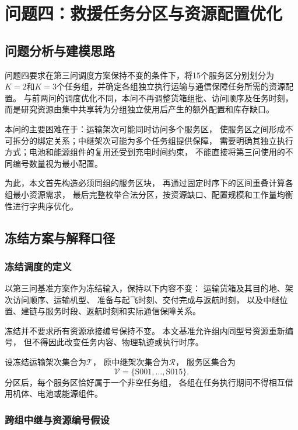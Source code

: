 \documentclass[bwprint]{gmcmthesis}
\begin{document}
\section{问题四：救援任务分区与资源配置优化}

\subsection{问题分析与建模思路}

问题四要求在第三问调度方案保持不变的条件下，将15个服务区分别划分为
$K=2$和$K=3$个任务组，并确定各组独立执行运输与通信保障任务所需的资源配置。
与前两问的调度优化不同，本问不再调整货箱组批、访问顺序及任务时刻，
而是研究资源由集中共享转为分组独立使用后产生的额外配置和库存缺口。

本问的主要困难在于：运输架次可能同时访问多个服务区，
使服务区之间形成不可拆分的绑定关系；中继架次可能为多个任务组提供保障，
需要明确其独立执行方式；电池和能源组件的复用还受到充电时间约束，
不能直接将第三问使用的不同编号数量视为最小配置。

为此，本文首先构造必须同组的服务区块，
再通过固定时序下的区间重叠计算各组最小资源需求，
最后完整枚举合法分区，按资源缺口、配置规模和工作量均衡性进行字典序优化。

\subsection{冻结方案与解释口径}

\subsubsection{冻结调度的定义}

以第三问基准方案作为冻结输入，保持以下内容不变：
运输货箱及其目的地、架次访问顺序、运输机型、
准备与起飞时刻、交付完成与返航时刻，
以及中继位置、建链与服务时段、返航时刻和实际通信保障关系。

冻结并不要求所有资源承接编号保持不变。
本文基准允许组内同型号资源重新编号，
但不得因此改变任务内容、物理轨迹或执行时序。

设冻结运输架次集合为$\mathcal{T}$，
原中继架次集合为$\mathcal{R}$，
服务区集合为
\begin{equation}
\mathcal{V}=\{\mathrm{S001},\ldots,\mathrm{S015}\}.
\end{equation}
分区后，每个服务区恰好属于一个非空任务组，
各组在任务执行期间不得相互借用机体、电池或能源组件。

\subsubsection{跨组中继与资源编号假设}
\end{document}
